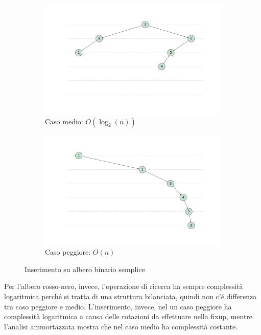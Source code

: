 \documentclass[a4paper,12pt]{article}
\begin{document}
    \begin{figure}[h]
      \centering
      \begin{subfigure}{0.49\textwidth}
        \includegraphics[width=\linewidth]{NBT insertion average case}
        \caption{Caso medio: $O(\log_2(n))$}
        \label{fig:immagine1}
      \end{subfigure}
      \hfill
      \begin{subfigure}{0.49\textwidth}
        \includegraphics[width=\linewidth]{NBT insertion worst case}
        \caption{Caso peggiore: $O(n)$}
        \label{fig:immagine2}
      \end{subfigure}
      \caption{Inserimento su albero binario semplice}
      \label{fig:entrambe}
    \end{figure}

    Per l'albero rosso-nero, invece, l'operazione di ricerca ha sempre complessità logaritmica perché si tratta di una
    struttura bilanciata, quindi non c'é differenza tra caso peggiore e medio.
    L'inserimento, invece, nel un caso peggiore ha complessità logaritmica a causa delle rotazioni da effettuare nella
    fixup, mentre l'analisi ammortazzata mostra che nel caso medio ha complessità costante.
\end{document}
